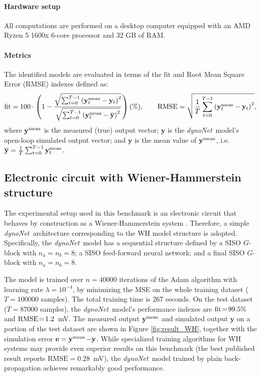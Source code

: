 \documentclass{article}
\newcommand{\tvec}[1]{\mathbf{#1}}
\newcommand{\nsamp}{T}
\newcommand{\Name}{\emph{dynoNet}}
\begin{document}
\paragraph{Hardware setup} All computations are performed on a desktop computer equipped with an AMD Ryzen 5 1600x 6-core processor and 32 GB of RAM.

\paragraph{Metrics}
The identified models are evaluated in terms of the $\mathrm{fit}$ and Root Mean Square Error (RMSE) indexes defined as:
\begin{equation*}
\mathrm{fit} = 100\cdot \left(1- \frac{\sqrt{\sum_{t=0}^{\nsamp-1} \left(\tvec{y}^{\rm meas}_t -  {\tvec{y}}_t\right)^2} }  
{\sqrt{\sum_{t=0}^{\nsamp-1} \left(\tvec{y}^{\rm meas}_t -  {\overline{\tvec{y}}}\right)^2}}\right) (\%), 
\qquad 
\mathrm{RMSE} = \sqrt{\frac{1}{\nsamp} \sum_{t=0}^{\nsamp-1} \left(\tvec{y}^{\rm meas}_t - {\tvec{y}}_t\right)^2 },
\end{equation*}
where $\tvec{y}^{\rm meas}$ is the measured (true) output vector; ${\tvec{y}}$ is the \Name\ model's open-loop  simulated output vector;  
and $\overline{\tvec{y}}$ is the mean value of $\tvec{y^{\rm meas}}$, i.e. $\overline{\tvec{y}} = \frac{1}{\nsamp} \sum_{t=0}^{\nsamp-1} \tvec{y}^{\rm meas}_t$.


\subsection{Electronic circuit with Wiener-Hammerstein structure}
The experimental setup used in this benchmark is an electronic circuit that behaves by construction as a Wiener-Hammerstein system \cite{ljung2009wiener}. Therefore, a simple \Name\ architecture corresponding to the WH model structure is adopted. Specifically, the \Name\ model has a sequential structure defined by a SISO $G$-block with $n_a = n_b = 8$; a SISO feed-forward neural network; and a final SISO $G$-block with $n_a = n_b = 8$. 

The model is trained over $n=40000$ iterations of the Adam algorithm with learning rate $\lambda=10^{-4}$, by minimizing the  MSE on the whole training dataset ($\nsamp=100000$ samples). The total training time is 267 seconds.
On the test dataset ($\nsamp=87000$ samples), the \Name\ model's performance indexes are $\rm fit\!=\!99.5\%$ and $\rm{RMSE}\!=\!1.2$~mV. 
The measured output $\tvec{y}^{\rm meas}$ and simulated output $\tvec{y}$ on a portion of the test dataset are shown in Figure \ref{fig:result_WH}, together with the simulation error 
$\tvec{e} = \tvec{y}^{\rm meas}\! -\! \tvec{y}$.
While specialized training algorithms for WH systems may provide even superior results on this benchmark 
(the best published result \cite{schoukens2014identification} reports $\mathrm{RMSE}=0.28$~mV), the 
\Name\ model trained by plain back-propagation achieves remarkably good performance. 
\end{document}
